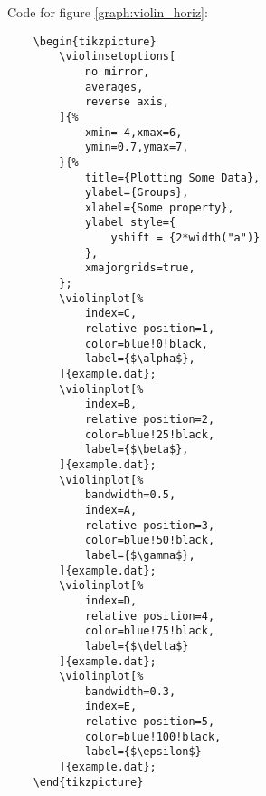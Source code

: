\documentclass{article}
\begin{document}
Code for figure \ref{graph:violin_horiz}:


\begin{verbatim}
	\begin{tikzpicture}
		\violinsetoptions[
			no mirror,
			averages,
			reverse axis,
		]{%
			xmin=-4,xmax=6,
			ymin=0.7,ymax=7,
		}{%
			title={Plotting Some Data},
			ylabel={Groups},
			xlabel={Some property},
			ylabel style={
				yshift = {2*width("a")}
			},
			xmajorgrids=true,
		};
		\violinplot[%
			index=C,
			relative position=1,
			color=blue!0!black,
			label={$\alpha$},
		]{example.dat};
		\violinplot[%
			index=B,
			relative position=2,
			color=blue!25!black,
			label={$\beta$},
		]{example.dat};
		\violinplot[%
			bandwidth=0.5,
			index=A,
			relative position=3,
			color=blue!50!black,
			label={$\gamma$},
		]{example.dat};
		\violinplot[%
			index=D,
			relative position=4,
			color=blue!75!black,
			label={$\delta$}
		]{example.dat};
		\violinplot[%
			bandwidth=0.3,
			index=E,
			relative position=5,
			color=blue!100!black,
			label={$\epsilon$}
		]{example.dat};
	\end{tikzpicture}
\end{verbatim}
\end{document}
